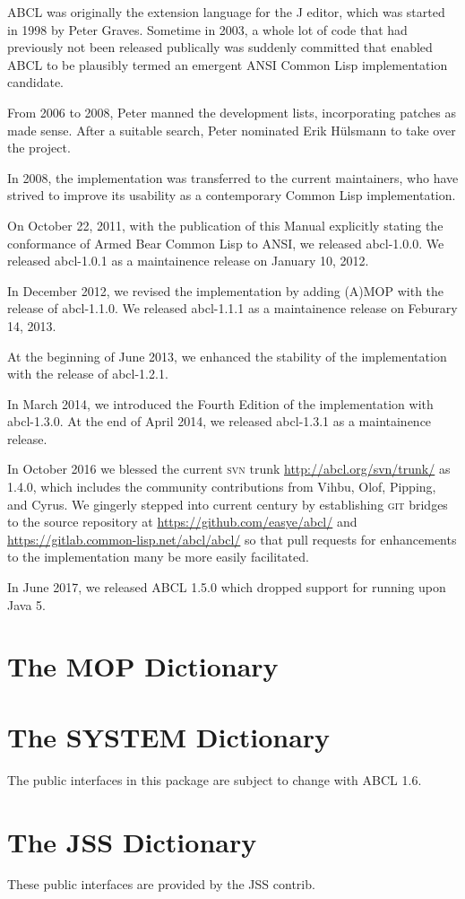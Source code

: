 \documentclass[10pt]{book}
\begin{document}
\textsc{ABCL} was originally the extension language for the J editor, which was
started in 1998 by Peter Graves.  Sometime in 2003, a whole lot of
code that had previously not been released publically was suddenly
committed that enabled ABCL to be plausibly termed an emergent ANSI
Common Lisp implementation candidate.

From 2006 to 2008, Peter manned the development lists, incorporating
patches as made sense.  After a suitable search, Peter nominated Erik
H\"{u}lsmann to take over the project.

In 2008, the implementation was transferred to the current
maintainers, who have strived to improve its usability as a
contemporary Common Lisp implementation.

On October 22, 2011, with the publication of this Manual explicitly
stating the conformance of Armed Bear Common Lisp to \textsc{ANSI}, we
released abcl-1.0.0.  We released abcl-1.0.1 as a maintainence release
on January 10, 2012.

In December 2012, we revised the implementation by adding
\textsc{(A)MOP} with the release of abcl-1.1.0.  We released
abcl-1.1.1 as a maintainence release on Feburary 14, 2013.

At the beginning of June 2013, we enhanced the stability of the
implementation with the release of abcl-1.2.1.

In March 2014, we introduced the Fourth Edition of the implementation
with abcl-1.3.0.  At the end of April 2014, we released abcl-1.3.1 as
a maintainence release.

In October 2016 we blessed the current \textsc{svn} trunk
\url{http://abcl.org/svn/trunk/} as 1.4.0, which includes the
community contributions from Vihbu, Olof, Pipping, and Cyrus.  We
gingerly stepped into current century by establishing \textsc{git}
bridges to the source repository at
\url{https://github.com/easye/abcl/} and
\url{https://gitlab.common-lisp.net/abcl/abcl/} so that pull
requests for enhancements to the implementation many be more easily
facilitated.

In June 2017, we released ABCL 1.5.0 which dropped support for running
upon Java 5.

\appendix 

\chapter{The MOP Dictionary}



\chapter{The SYSTEM Dictionary}

The public interfaces in this package are subject to change with
\textsc{ABCL} 1.6.



\chapter{The JSS Dictionary}

These public interfaces are provided by the JSS contrib.






\printindex
\end{document}
